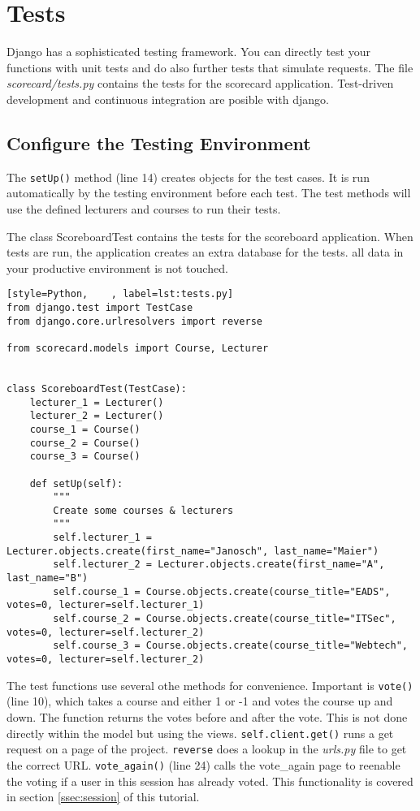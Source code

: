 \section{Tests}

Django has a sophisticated testing framework. You can directly test your functions with unit tests and do also further tests that simulate requests. The file \emph{scorecard/tests.py} contains the tests for the scorecard application. Test-driven development and continuous integration are posible with django.

\subsection{Configure the Testing Environment}
The \lstinline|setUp()| method (line 14) creates objects for the test cases. It is run automatically by the testing environment before each test. The test methods will use the defined lecturers and courses to run their tests.

The class ScoreboardTest contains the tests for the scoreboard application. When tests are run, the application creates an extra database for the tests. all data in your productive environment is not touched.

\begin{lstlisting}[style=Python, 	, label=lst:tests.py]
from django.test import TestCase
from django.core.urlresolvers import reverse

from scorecard.models import Course, Lecturer


class ScoreboardTest(TestCase):
    lecturer_1 = Lecturer()
    lecturer_2 = Lecturer()
    course_1 = Course()
    course_2 = Course()
    course_3 = Course()

    def setUp(self):
        """
        Create some courses & lecturers
        """
        self.lecturer_1 = Lecturer.objects.create(first_name="Janosch", last_name="Maier")
        self.lecturer_2 = Lecturer.objects.create(first_name="A", last_name="B")
        self.course_1 = Course.objects.create(course_title="EADS", votes=0, lecturer=self.lecturer_1)
        self.course_2 = Course.objects.create(course_title="ITSec", votes=0, lecturer=self.lecturer_2)
        self.course_3 = Course.objects.create(course_title="Webtech", votes=0, lecturer=self.lecturer_2)
\end{lstlisting}

The test functions use several othe methods for convenience. Important is \lstinline|vote()| (line 10), which takes a course and either 1 or -1 and votes the course up and down. The function returns the votes before and after the vote. This is not done directly within the model but using the views. \lstinline|self.client.get()| runs a get request on a page of the project. \lstinline|reverse| does a lookup in the \emph{urls.py} file to get the correct URL. \lstinline|vote_again()| (line 24) calls the vote\_again page to reenable the voting if a user in this session has already voted. This functionality is covered in section \ref{ssec:session} of this tutorial.

